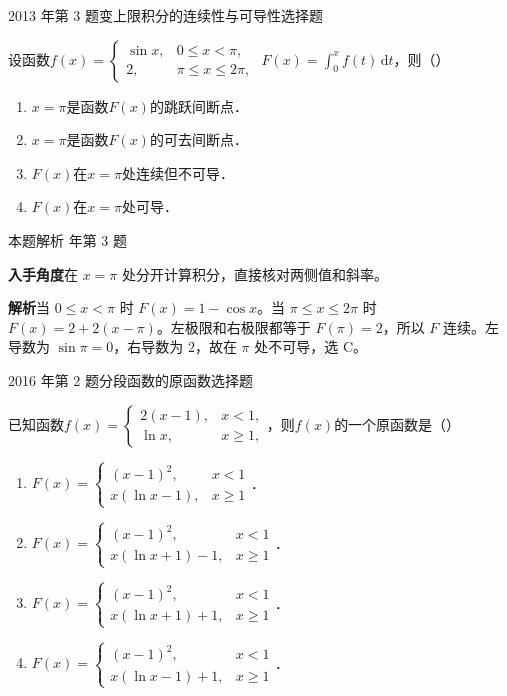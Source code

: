 \documentclass[UTF8,zihao=-4,fontset=fandol]{ctexart}
\newcommand{\pickout}{\hfill（\hspace{1.4em}）}
\newenvironment{abcd}{\begin{enumerate}[label=\textup{(\Alph*)},leftmargin=2.3em,itemsep=1pt,topsep=4pt,parsep=1pt]}{\end{enumerate}}
\newcommand{\QuestionPage}[6]{%
  \par\noindent\begin{minipage}{\linewidth}
  \raggedright
  {\small\textcolor{black!60}{#3\quad #5}\hfill\textcolor{accent}{#2}}\par\smallskip}
\newcommand{\QuestionEnd}{\end{minipage}\par\medskip}
\newcommand{\QuestionPage}[6]{%
  \clearpage
  {\small\textcolor{accent}{#1\hfill #2}}\par\medskip
  {\small\textcolor{black!60}{#3\quad #5\hfill #6}}\par\vspace{9bp}}
\newcommand{\QuestionEnd}{}
\newenvironment{QuestionSolution}[1]{%
  \clearpage
  {\small\textcolor{black!60}{本题解析\quad #1}}\par\medskip
}{\par\clearpage}
\begin{document}
\QuestionPage{3.2 微积分基本公式与基本定理}{选择题}{2013 年第 3 题}{1}{变上限积分的连续性与可导性}{142 / 234}
设函数$f(x) = \begin{cases}
  \sin x, & 0 \le x < \pi , \\
       2, & \pi \le x \le 2\pi ,
\end{cases}$ $F(x) = \int_0^x f(t) \,\mathrm{d} t$，则\pickout{}
\begin{abcd}
\item $x = \pi$是函数$F(x)$的跳跃间断点．
\item $x = \pi$是函数$F(x)$的可去间断点．
\item $F(x)$在$x = \pi$处连续但不可导．
\item $F(x)$在$x = \pi$处可导．
\end{abcd}
\QuestionEnd

\begin{QuestionSolution}{2013 年第 3 题}
\textbf{入手角度}\quad 在 \(x=\pi\) 处分开计算积分，直接核对两侧值和斜率。

\textbf{解析}\quad 当 \(0\le x<\pi\) 时 \(F(x)=1-\cos x\)。当 \(\pi\le x\le2\pi\) 时 \(F(x)=2+2(x-\pi)\)。左极限和右极限都等于 \(F(\pi)=2\)，所以 \(F\) 连续。左导数为 \(\sin\pi=0\)，右导数为 \(2\)，故在 \(\pi\) 处不可导，选 C。
\end{QuestionSolution}

\QuestionPage{3.2 微积分基本公式与基本定理}{选择题}{2016 年第 2 题}{1}{分段函数的原函数}{143 / 234}
已知函数$f(x) = \begin{cases}
  2(x - 1), & x < 1, \\
     \ln x, & x \ge 1,
\end{cases}$，则$f(x)$的一个原函数是\pickout{}
\begin{abcd}
\item $F(x) = \begin{cases}
                 (x - 1)^2, & x < 1 \\
  x\left(\ln x - 1 \right), & x \ge 1
\end{cases}$．
\item $F(x) = \begin{cases}
                     (x - 1)^2, & x < 1 \\
  x\left(\ln x + 1 \right) - 1, & x \ge 1
\end{cases}$．
\item $F(x) = \begin{cases}
                     (x - 1)^2, & x < 1 \\
  x\left(\ln x + 1 \right) + 1, & x \ge 1
\end{cases}$．
\item $F(x) = \begin{cases}
                     (x - 1)^2, & x < 1 \\
  x\left(\ln x - 1 \right) + 1, & x \ge 1
\end{cases}$．
\end{abcd}
\QuestionEnd
\end{document}
